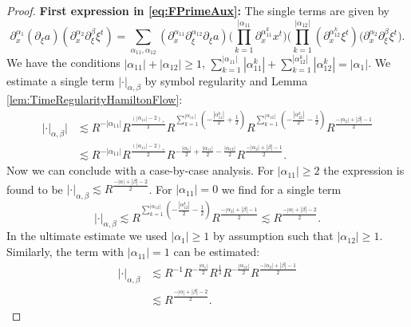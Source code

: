 \documentclass{amsart}
\theoremstyle{definition}
\begin{document}
\begin{proof}
\textbf{First expression in \eqref{eq:FPrimeAux}:} The single terms are given by
\begin{equation*}
    \partial_x^{\alpha_1} (\partial_{\xi} a) (\partial_x^{\alpha_2} \partial_{\xi}^{\beta} \xi^t) = \sum_{\alpha_{11},\alpha_{12}} (\partial_{x}^{\alpha_{11}} \partial_{\xi}^{\alpha_{12}} \partial_{\xi} a) \big( \prod_{k=1}^{|\alpha_{11}} \partial_x^{\alpha_{11}^k} x^t \big) \big( \prod_{k=1}^{|\alpha_{12}|} (\partial_x^{\alpha_{12}^k} \xi^t) \big( \partial_x^{\alpha_2} \partial_{\xi}^{\beta} \xi^t \big).
\end{equation*}
We have the conditions $|\alpha_{11}| + |\alpha_{12}| \geq 1$, $\sum_{k=1}^{|\alpha_{11}|} |\alpha_{11}^k| + \sum_{k=1}^{|\alpha_{12}^k|} |\alpha_{12}^k| = |\alpha_1|$. We estimate a single term $|\cdot|_{\alpha,\beta}$ by symbol regularity and Lemma \ref{lem:TimeRegularityHamiltonFlow}:
\begin{equation*}
\begin{split}
|\cdot|_{\alpha,\beta}| &\lesssim R^{-|\alpha_{11}|} R^{\frac{(|\alpha_{11}|-2)_+}{2}} R^{\sum_{k=1}^{|\alpha_{11}|} (- \frac{|\alpha_{11}^k|}{2} + \frac{1}{2})} R^{\sum_{k=1}^{|\alpha_{12}|} (- \frac{|\alpha_{12}^k|}{2} - \frac{1}{2} )} R^{\frac{-|\alpha_2|+|\beta|-1}{2}} \\
&\lesssim R^{-|\alpha_{11}|} R^{\frac{(|\alpha_{11}|-2)_+}{2}} R^{-\frac{|\alpha_1|}{2}+\frac{|\alpha_{11}|}{2}-\frac{|\alpha_{12}|}{2}} R^{\frac{-|\alpha_2|+|\beta|-1}{2}}.
\end{split}
\end{equation*}
Now we can conclude with a case-by-case analysis. For $|\alpha_{11}| \geq 2$ the expression is found to be $|\cdot|_{\alpha,\beta} \lesssim R^{\frac{-|\alpha|+|\beta|-2}{2}}$. For $|\alpha_{11}| = 0$ we find for a single term
\begin{equation*}
   |\cdot|_{\alpha,\beta} \lesssim R^{\sum_{k=1}^{|\alpha_{12}|} (- \frac{|\alpha_{12}^k|}{2} - \frac{1}{2})} R^{\frac{-|\alpha_2|+|\beta|-1}{2}} \lesssim R^{\frac{-|\alpha|+|\beta|-2}{2}}.
\end{equation*}
In the ultimate estimate we used $|\alpha_1| \geq 1$ by assumption such that $|\alpha_{12}| \geq 1$.
Similarly, the term with $|\alpha_{11}| = 1$ can be estimated:
\begin{equation*}
    \begin{split}
    |\cdot|_{\alpha,\beta} &\lesssim R^{-1} R^{-\frac{|\alpha_1|}{2}} R^{\frac{1}{2}} R^{-\frac{|\alpha_{12}|}{2}} R^{\frac{-|\alpha_2|+|\beta|-1}{2}} \\
    &\lesssim R^{\frac{-|\alpha|+|\beta|-2}{2}}.
    \end{split}
\end{equation*}


\end{proof}
\end{document}

